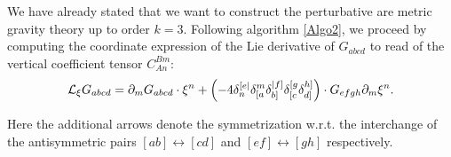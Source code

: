 We have already stated that we want to construct the perturbative are metric gravity theory up to order $k=3$. Following algorithm \ref{Algo2}, we proceed by computing the coordinate expression of the Lie derivative of $G_{abcd}$ to read of the vertical coefficient tensor $C_{An}^{Bm}$:
\begin{align}\label{LieArea}
    \mathcal{L}_{\xi} G_{abcd} = \partial_m G_{abcd} \cdot \xi^n + \left (-4 \delta_n^{[e\vert} \delta_{[\mathnode{a}}^m \delta_{b]}^{\vert \mathnode{f} ]} \delta_{[c}^{[g} \delta_{\mathnode{d}]}^{\mathnode{h}]} \right ) \cdot G_{efgh} \partial_m \xi^n.
\end{align}

Here the additional arrows denote the symmetrization w.r.t. the interchange of the antisymmetric pairs $[ab] \leftrightarrow [cd]$ and $[ef] \leftrightarrow [gh]$ respectively.

